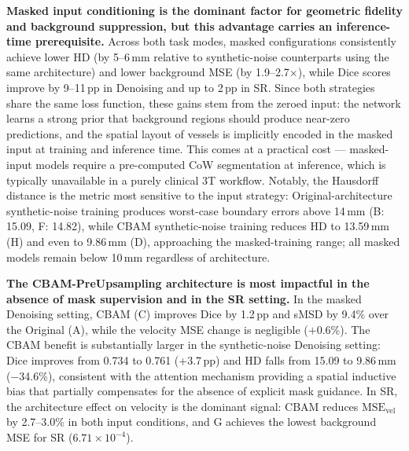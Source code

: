 \textbf{Masked input conditioning is the dominant factor for geometric fidelity and background
suppression, but this advantage carries an inference-time prerequisite.}  Across both task
modes, masked configurations consistently achieve lower HD (by 5--6\,mm relative to
synthetic-noise counterparts using the same architecture) and lower background MSE (by
1.9--2.7$\times$), while Dice scores improve by 9--11\,pp in Denoising and up to 2\,pp in SR.
Since both strategies share the same loss function, these gains stem from the zeroed input: the
network learns a strong prior that background regions should produce near-zero predictions, and
the spatial layout of vessels is implicitly encoded in the masked input at training and inference
time.  This comes at a practical cost --- masked-input models require a pre-computed CoW
segmentation at inference, which is typically unavailable in a purely clinical 3T workflow.
Notably, the Hausdorff distance is the metric most sensitive to the input strategy:
Original-architecture synthetic-noise training produces worst-case boundary errors above
14\,mm (B: 15.09, F: 14.82), while CBAM synthetic-noise training reduces HD to 13.59\,mm (H)
and even to 9.86\,mm (D), approaching the masked-training range; all masked models remain below
10\,mm regardless of architecture.

\textbf{The CBAM-PreUpsampling architecture is most impactful in the absence of mask supervision
and in the SR setting.}  In the masked Denoising setting, CBAM (C) improves Dice by 1.2\,pp and
sMSD by 9.4\% over the Original (A), while the velocity MSE change is negligible ($+$0.6\%).  The
CBAM benefit is substantially larger in the synthetic-noise Denoising setting: Dice improves from
0.734 to 0.761 (+3.7\,pp) and HD falls from 15.09 to 9.86\,mm ($-$34.6\%), consistent with the
attention mechanism providing a spatial inductive bias that partially compensates for the absence
of explicit mask guidance.  In SR, the architecture effect on velocity is the dominant signal:
CBAM reduces $\text{MSE}_\text{vel}$ by 2.7--3.0\% in both input conditions, and G achieves the
lowest background MSE for SR ($6.71{\times}10^{-4}$).

